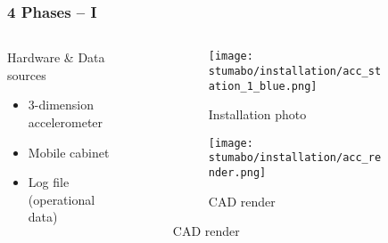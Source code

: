 \begin{frame}
    \frametitle{4 Phases -- I}
    \vspace*{\fill}
    \begin{columns}[onlytextwidth, c]
        \begin{column}{.47\textwidth}
            \begin{exampleblock}{Hardware \& Data sources}
                \begin{itemize}
                    \item 3-dimension accelerometer
                    \item Mobile cabinet
                    \item Log file (operational data)
                \end{itemize}
            \end{exampleblock}
        \end{column}

        \begin{column}{.52\textwidth}
            \begin{figure}[ht]
                \begin{subfigure}{0.49\textwidth}
                    \centering
                    \texttt{[image: stumabo/installation/acc\_station\_1\_blue.png]}
                    \caption{Installation photo}
                \end{subfigure}
                \begin{subfigure}{0.49\textwidth}
                    \centering
                    \texttt{[image: stumabo/installation/acc\_render.png]}
                    \caption{CAD render}
                \end{subfigure}
            \end{figure}
        \end{column}
    \end{columns}
    \vspace*{\fill}
\end{frame}

